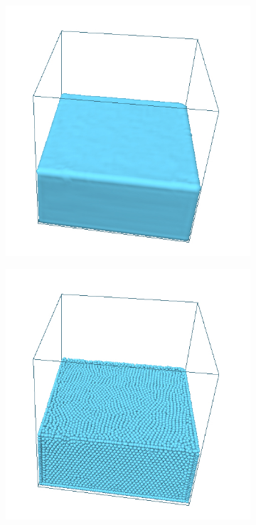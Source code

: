 \begin{figure}[h!]
    \captionsetup{justification=centering}
	\centering
	\begin{subfigure}[t]{.49\textwidth}
			\centering
        	\includegraphics[scale=1]{obrazky-figures/app/Simple04.jpg}
	\end{subfigure}%
	\begin{subfigure}[t]{.49\textwidth}
		\centering
		\includegraphics[scale=1]{obrazky-figures/app/Simple04Part.jpg}
	\end{subfigure}
	\label{fig:surfxPart}
\end{figure}

